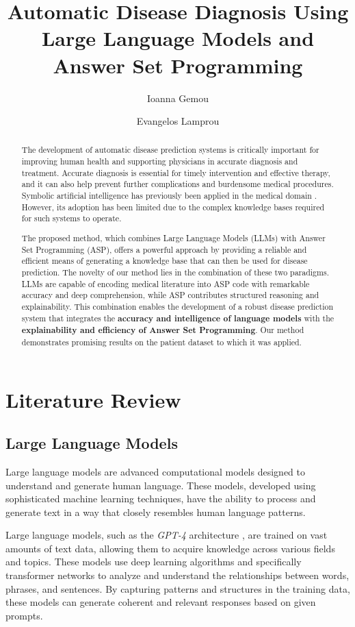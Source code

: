 \documentclass[10pt,leqno]{amsart}
\title{Automatic Disease Diagnosis Using Large Language Models and Answer Set Programming}
\author{
	Ioanna Gemou
	\and
	Evangelos Lamprou
}
\begin{document}
\maketitle
\begin{abstract}
The development of automatic disease prediction systems is critically important for improving human health and supporting physicians in accurate diagnosis and treatment. Accurate diagnosis is essential for timely intervention and effective therapy, and it can also help prevent further complications and burdensome medical procedures.
Symbolic artificial intelligence has previously been applied in the medical domain \cite{Alviano_2020}. However, its adoption has been limited due to the complex knowledge bases required for such systems to operate.

The proposed method, which combines Large Language Models (LLMs) with Answer Set Programming (ASP), offers a powerful approach by providing a reliable and efficient means of generating a knowledge base that can then be used for disease prediction.
The novelty of our method lies in the combination of these two paradigms. LLMs are capable of encoding medical literature into ASP code with remarkable accuracy and deep comprehension, while ASP contributes structured reasoning and explainability. This combination enables the development of a robust disease prediction system that integrates the \textbf{accuracy and intelligence of language models} with the \textbf{explainability and efficiency of Answer Set Programming}.
Our method demonstrates promising results on the patient dataset to which it was applied.
\end{abstract}

\section{Literature Review}

\subsection{Large Language Models}

Large language models \cite{zhao2023survey} are advanced computational models designed to understand and generate human language. These models, developed using sophisticated machine learning techniques, have the ability to process and generate text in a way that closely resembles human language patterns.

Large language models, such as the \textit{GPT-4} architecture \cite{openai2023gpt4}, are trained on vast amounts of text data, allowing them to acquire knowledge across various fields and topics. These models use deep learning algorithms \cite{Sarker2021} and specifically transformer networks \cite{Dosovitskiy2020} to analyze and understand the relationships between words, phrases, and sentences. By capturing patterns and structures in the training data, these models can generate coherent and relevant responses based on given prompts.
\end{document}
